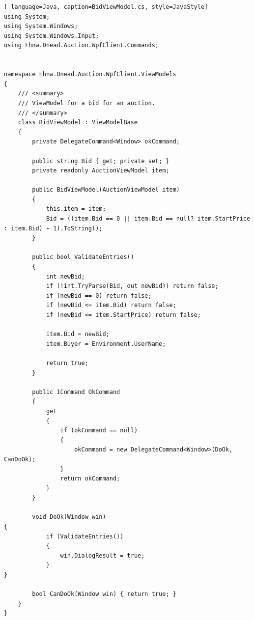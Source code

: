 \documentclass[10pt]{article}
\begin{document}
\begin{lstlisting}[ language=Java, caption=BidViewModel.cs, style=JavaStyle]
using System;
using System.Windows;
using System.Windows.Input;
using Fhnw.Dnead.Auction.WpfClient.Commands;


namespace Fhnw.Dnead.Auction.WpfClient.ViewModels
{
    /// <summary>
    /// ViewModel for a bid for an auction.
    /// </summary>
    class BidViewModel : ViewModelBase
    {
        private DelegateCommand<Window> okCommand;

        public string Bid { get; private set; }
        private readonly AuctionViewModel item;

        public BidViewModel(AuctionViewModel item)
        {
            this.item = item;
            Bid = ((item.Bid == 0 || item.Bid == null? item.StartPrice : item.Bid) + 1).ToString();
        }

        public bool ValidateEntries()
        {
            int newBid;
            if (!int.TryParse(Bid, out newBid)) return false;
            if (newBid == 0) return false;
            if (newBid <= item.Bid) return false;
            if (newBid <= item.StartPrice) return false;

            item.Bid = newBid;
            item.Buyer = Environment.UserName;

            return true;
        }

        public ICommand OkCommand
        {
            get
            {
                if (okCommand == null)
                {
                    okCommand = new DelegateCommand<Window>(DoOk, CanDoOk);
                }
                return okCommand;
            }
        }

        void DoOk(Window win)
{
            if (ValidateEntries())
            {
                win.DialogResult = true;
            }
}

        bool CanDoOk(Window win) { return true; }
    }
}
\end{lstlisting}

\end{document}
